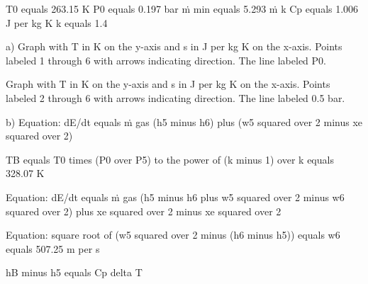 T0 equals 263.15 K  
P0 equals 0.197 bar  
ṁ min equals 5.293 ṁ k  
Cp equals 1.006 J per kg K  
k equals 1.4

a)  
Graph with T in K on the y-axis and s in J per kg K on the x-axis. Points labeled 1 through 6 with arrows indicating direction. The line labeled P0.

Graph with T in K on the y-axis and s in J per kg K on the x-axis. Points labeled 2 through 6 with arrows indicating direction. The line labeled 0.5 bar.

b)  
Equation: dE/dt equals ṁ gas (h5 minus h6) plus (w5 squared over 2 minus xe squared over 2)

TB equals T0 times (P0 over P5) to the power of (k minus 1) over k equals 328.07 K

Equation: dE/dt equals ṁ gas (h5 minus h6 plus w5 squared over 2 minus w6 squared over 2) plus xe squared over 2 minus xe squared over 2

Equation: square root of (w5 squared over 2 minus (h6 minus h5)) equals w6 equals 507.25 m per s

hB minus h5 equals Cp delta T